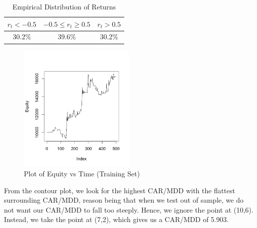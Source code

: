 \documentclass[12pt]{article}
\theoremstyle{definition}
\begin{document}
\begin{table}
\centering
\begin{tabular}{|c| c |c|} 
 \hline
$r_{t}<-0.5$ & $-0.5\le r_{t} \ge 0.5$ & $r_{t}>0.5$ \\
 \hline
30.2\% & 39.6\% & 30.2\% \\
 \hline
\end{tabular}
\caption{Empirical Distribution of Returns}
\label{table:3}
\end{table}

\begin{figure}
\centering
\includegraphics[width=0.5\textwidth]{trg}
\caption{Plot of Equity vs Time (Training Set)}
\end{figure}
From the contour plot, we look for the highest CAR/MDD with the flattest surrounding CAR/MDD, reason being that when we test out of sample, we do not want our CAR/MDD to fall too steeply. Hence, we ignore the point at (10,6). Instead, we take the point at (7,2), which gives us a CAR/MDD of 5.903.
\end{document}
